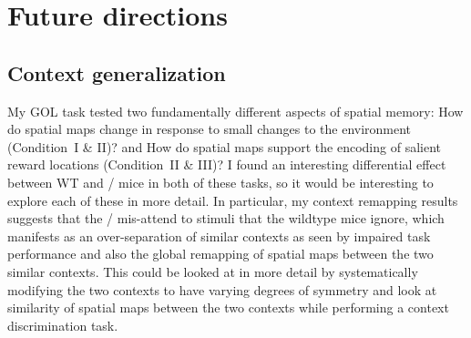 





\section{Future directions}



\subsection{Context generalization}
My \ac{GOL} task tested two fundamentally different aspects of spatial memory: How do spatial maps change in response to small changes to the environment (Condition~I \& II)? and How do spatial maps support the encoding of salient reward locations (Condition~II \& III)?
I found an interesting differential effect between WT and \df/ mice in both of these tasks, so it would be interesting to explore each of these in more detail.
In particular, my context remapping results suggests that the \df/ mis-attend to stimuli that the wildtype mice ignore, which manifests as an over-separation of similar contexts as seen by impaired task performance and also the global remapping of spatial maps between the two similar contexts.
This could be looked at in more detail by systematically modifying the two contexts to have varying degrees of symmetry and look at similarity of spatial maps between the two contexts while performing a context discrimination task.

